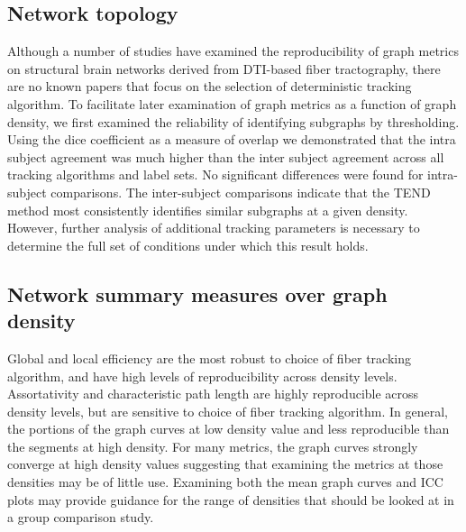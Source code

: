 \documentclass{frontiersSCNS} %
\begin{document}



\subsection{Network topology}
Although a number of studies have examined the reproducibility of graph metrics on 
structural brain networks derived from DTI-based fiber tractography, there are no known 
papers that focus on the selection of deterministic tracking algorithm. To facilitate later examination of
graph metrics as a function of graph density, we first examined the reliability of identifying
subgraphs by thresholding. Using the dice coefficient as a measure of overlap we demonstrated
that the intra subject agreement was much higher than the inter subject agreement across all tracking algorithms and 
label sets. No significant differences were found for intra-subject comparisons. The inter-subject comparisons indicate that 
the TEND method most consistently identifies similar subgraphs at a given density. However, further analysis 
of additional tracking parameters is necessary to determine the full set of conditions under which this result holds.


\subsection{Network summary measures over graph density}
Global and local efficiency are the most robust to choice of fiber tracking algorithm, and have high levels 
of reproducibility across density levels. Assortativity and characteristic path length are highly reproducible across
density levels, but are sensitive to choice of fiber tracking algorithm. In general, the portions of the graph curves
at low density value and less reproducible than the segments at high density.  For many metrics, the graph curves 
strongly converge at high density values suggesting that examining the metrics at those densities may be of 
little use. Examining both the mean graph curves and ICC plots may provide guidance for the range of densities
that should be looked at in a group comparison study. 
\end{document}
